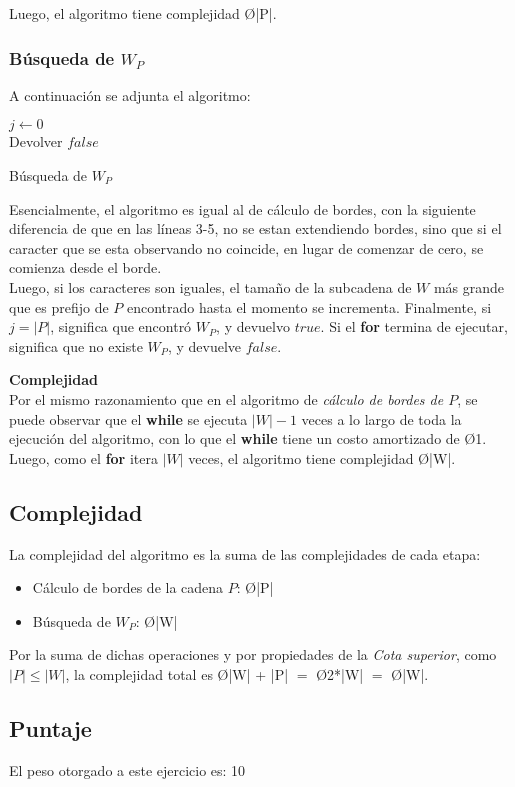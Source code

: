 Luego, el algoritmo tiene complejidad \O{|P|}.\\
\strut\hfill\qedsymbol

\subsubsection{Búsqueda de $W_P$}
A continuación se adjunta el algoritmo:\\
\begin{algorithm}[H]
 \DontPrintSemicolon
 $j \gets 0$\\
 Devolver $false$
 \caption{Búsqueda de $W_P$}
\end{algorithm}

Esencialmente, el algoritmo es igual al de cálculo de bordes, con la siguiente diferencia de que en las líneas 3-5, no se estan extendiendo bordes, sino que si el caracter que se esta observando no coincide, en lugar de comenzar de cero, se comienza desde el borde.\\

Luego, si los caracteres son iguales, el tamaño de la subcadena de $W$ más grande que es prefijo de $P$ encontrado hasta el momento se incrementa.
Finalmente, si $j = |P|$, significa que encontró $W_P$, y devuelvo $true$. Si el \textbf{for} termina de ejecutar, significa que no existe $W_P$, y devuelve $false$.

\textbf{Complejidad}\\
Por el mismo razonamiento que en el algoritmo de \emph{cálculo de bordes de $P$}, se puede observar que el \textbf{while} se ejecuta $|W|-1$ veces a lo largo de toda la ejecución del algoritmo, con lo que el \textbf{while} tiene un costo amortizado de \O{1}. Luego, como el \textbf{for} itera $|W|$ veces, el algoritmo tiene complejidad \O{|W|}.

\subsection{Complejidad}
La complejidad del algoritmo es la suma de las complejidades de cada etapa:
\begin{itemize}
	\item Cálculo de bordes de la cadena $P$: \O{|P|}
	\item Búsqueda de $W_P$: \O{|W|}
\end{itemize}

Por la suma de dichas operaciones y por propiedades de la \emph{Cota superior}, como $|P| \leq |W|$, la complejidad total es \O{|W| + |P|} $ = $ \O{2*|W|} $=$ \O{|W|}.

\subsection{Puntaje}
El peso otorgado a este ejercicio es: 10
